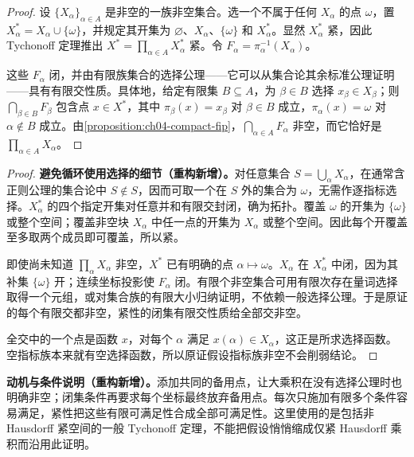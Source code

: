 \documentclass[../../main.tex]{subfiles}
\begin{document}
\begin{proof}
设 $\{X_\alpha\}_{\alpha\in A}$ 是非空的一族非空集合。选一个不属于任何 $X_\alpha$ 的点 $\omega$，置 $X_\alpha^*=X_\alpha\cup\{\omega\}$，并规定其开集为 $\varnothing$、$X_\alpha$、$\{\omega\}$ 和 $X_\alpha^*$。显然 $X_\alpha^*$ 紧，因此 Tychonoff 定理推出 $X^*=\prod_{\alpha\in A}X_\alpha^*$ 紧。令 $F_\alpha=\pi_\alpha^{-1}(X_\alpha)$。

这些 $F_\alpha$ 闭，并由有限族集合的选择公理——它可以从集合论其余标准公理证明——具有有限交性质。具体地，给定有限集 $B\subseteq A$，为 $\beta\in B$ 选择 $x_\beta\in X_\beta$；则 $\bigcap_{\beta\in B}F_\beta$ 包含点 $x\in X^*$，其中 $\pi_\beta(x)=x_\beta$ 对 $\beta\in B$ 成立，$\pi_\alpha(x)=\omega$ 对 $\alpha\notin B$ 成立。由\cref{proposition:ch04-compact-fip}，$\bigcap_{\alpha\in A}F_\alpha$ 非空，而它恰好是 $\prod_{\alpha\in A}X_\alpha$。
\end{proof}
\begin{proof}
\textbf{避免循环使用选择的细节（重构新增）。}对任意集合 $S=\bigcup_\alpha X_\alpha$，在通常含正则公理的集合论中 $S\notin S$，因而可取一个在 $S$ 外的集合为 $\omega$，无需作逐指标选择。$X_\alpha^*$ 的四个指定开集对任意并和有限交封闭，确为拓扑。覆盖 $\omega$ 的开集为 $\{\omega\}$ 或整个空间；覆盖非空块 $X_\alpha$ 中任一点的开集为 $X_\alpha$ 或整个空间。因此每个开覆盖至多取两个成员即可覆盖，所以紧。

即使尚未知道 $\prod_\alpha X_\alpha$ 非空，$X^*$ 已有明确的点 $\alpha\mapsto\omega$。$X_\alpha$ 在 $X_\alpha^*$ 中闭，因为其补集 $\{\omega\}$ 开；连续坐标投影使 $F_\alpha$ 闭。有限个非空集合可用有限次存在量词选择取得一个元组，或对集合族的有限大小归纳证明，不依赖一般选择公理。于是原证的每个有限交都非空，紧性的闭集有限交性质给全部交非空。

全交中的一个点是函数 $x$，对每个 $\alpha$ 满足 $x(\alpha)\in X_\alpha$，这正是所求选择函数。空指标族本来就有空选择函数，所以原证假设指标族非空不会削弱结论。
\end{proof}
\begin{remark}
\textbf{动机与条件说明（重构新增）。}添加共同的备用点，让大乘积在没有选择公理时也明确非空；闭集条件再要求每个坐标最终放弃备用点。每次只施加有限多个条件容易满足，紧性把这些有限可满足性合成全部可满足性。这里使用的是包括非 Hausdorff 紧空间的一般 Tychonoff 定理，不能把假设悄悄缩成仅紧 Hausdorff 乘积而沿用此证明。
\end{remark}
\end{document}
